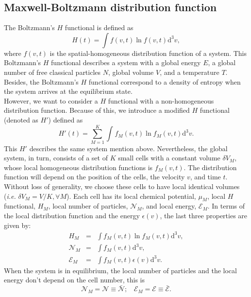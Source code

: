 \documentclass{article}
\begin{document}
\subsection{Maxwell-Boltzmann distribution function}
The Boltzmann's $H$ functional is defined as
\begin{equation}
    H(t)=\int f(v,t) \ln f(v,t) \mathrm{d}^{3}v,
\end{equation}
where $f(v,t)$ is the spatial-homogeneous distribution function of a system. This Boltzmann's $H$ functional describes a system with a global energy $E$, a global number of free
classical particles $N$, global volume $V$, and a temperature $T$. 
Besides, the Boltzmann's $H$ functional correspond to a density of entropy when the system arrives at the equilibrium state.\\
However, we want to consider a $H$ functional with a non-homogeneous distribution function. Because of this, we introduce a modified $H$ functional (denoted as $H'$) defined as
\begin{equation}
   H'(t)=\sum_{M=1}^{K}\int_{}^{} f_M(v,t) \ln f_M(v,t)\mathrm{d}^3v  \label{CH2}.
\end{equation}
This $H'$ describes the same system mention above. Nevertheless, the global system, in turn, consists of a set of $K$ small cells with a constant volume $\delta V_M$, whose local homogeneous distribution functions is $f_{M}(v,t)$. The distribution function will depend on the position of the cells, the velocity $v$, and time $t$. Without loss of generality, we choose these cells to have
local identical volumes (\textit{i.e.} $\delta V_M = V/K, \forall M$). Each cell has its local chemical potential, $\mu_M$, local
$H$ functional, $H_M$, local number of particles, $\mathcal{N}_M$, and local energy, $\mathcal{E}_M$. In terms of the local distribution 
function and the energy $\epsilon(v)$, the last three properties are given by:
\begin{eqnarray}
    H_M &=&  \int f_M(v,t) \ln f_{M}(v,t) \mathrm{d}^{3}v \label{Hcell},\\
    {\mathcal{N}}_M&=& \int f_{M}(v ,t) \mathrm{d}^{3}v, \nonumber \\
{\mathcal{E}}_M&=& \int f_{M}(v,t)\epsilon(v) \mathrm{d}^{3}v.
\end{eqnarray}
When the system is in equilibrium, the local number of particles and the local energy don't depend on the cell number, this is
\begin{equation}
   {\mathcal{N}}_M=\mathcal{N}\equiv \bar{\mathcal{N}}; \ \ \ \  {\mathcal{E}}_M=\mathcal{E}\equiv \bar{\mathcal{E}}.
\end{equation}
\end{document}
